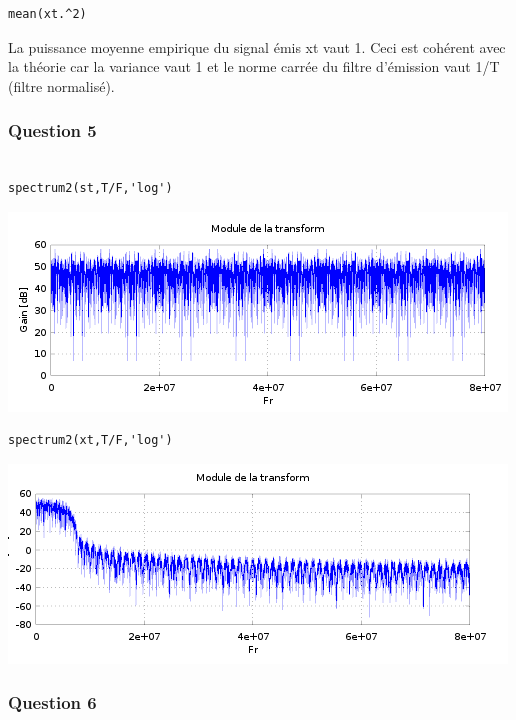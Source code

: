 \documentclass{acm_proc_article-sp}
\begin{document}
\begin{center}
\begin{center}
\begin{lstlisting}
mean(xt.^2)
\end{lstlisting}

La puissance moyenne empirique du signal émis xt vaut 1. Ceci est cohérent avec la théorie car la variance vaut 1 et le norme carrée du filtre d'émission vaut 1/T (filtre normalisé).

\subsubsection{Question 5}
\begin{lstlisting}

spectrum2(st,T/F,'log')
\end{lstlisting}

\begin{center}
\includegraphics[scale=0.45]{EstimationDSPst.png}
\end{center}

\begin{lstlisting}
spectrum2(xt,T/F,'log')
\end{lstlisting}

\begin{center}
\includegraphics[scale=0.45]{EstimationDSPxt.png}
\end{center}

\subsubsection{Question 6}



\end{center}
\end{center}
\end{document}
